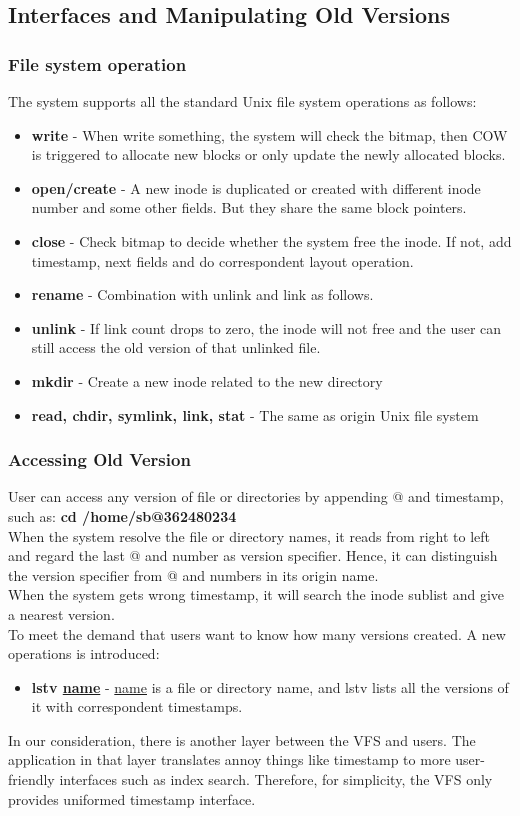\subsection{Interfaces and Manipulating Old Versions}
\subsubsection{File system operation}
The system supports all the standard Unix file system operations as follows:
\begin{itemize}
\item \textbf{write} - When write something, the system will check the bitmap, then COW is triggered to allocate new blocks or only update the newly allocated blocks.
\item \textbf{open/create} - A new inode is duplicated or created with different inode number and some other fields. But they share the same block pointers.
\item \textbf{close} - Check bitmap to decide whether the system free the inode. If not, add timestamp, next fields and do correspondent layout operation.
\item \textbf{rename} - Combination with unlink and link as follows.
\item \textbf{unlink} - If link count drops to zero, the inode will not free and the user can still access the old version of that unlinked file.
\item \textbf{mkdir} - Create a new inode related to the new directory
\item \textbf{read, chdir, symlink, link, stat} - The same as origin Unix file system
\end{itemize}
\subsubsection{Accessing Old Version}
User can access any version of file or directories by appending @ and timestamp, such as:  \textbf{cd /home/sb@362480234}\\[1em]When the system resolve the file or directory names, it reads from right to left and regard the last @ and number as version specifier. Hence, it can distinguish the version specifier from @ and numbers in its origin name.\\[1em]
When the system gets wrong timestamp, it will search the inode sublist and give a nearest version.\\[1em]
To meet the demand that users want to know how many versions created. A new operations is  introduced:
\begin{itemize}
\item \textbf{lstv \underline{name}} - \underline{name} is a file or directory name, and lstv lists all the versions of it with correspondent timestamps.
\end{itemize}
In our consideration, there is another layer between the VFS and users. The application in that layer translates annoy things like timestamp to more user-friendly interfaces such as index search. Therefore, for simplicity, the VFS only provides uniformed timestamp interface.
